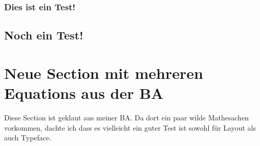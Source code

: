 \subsubsection{Dies ist ein Test!}
\lipsum[10-11]
\subsection{Noch ein Test!}
\lipsum[12-14]
\cite{tikhanovskayaUniversalityCrossEntropy2023}
\section{Neue Section mit mehreren Equations aus der BA}
Diese Section ist geklaut aus meiner BA. Da dort ein paar wilde Mathesachen
vorkommen, dachte ich dass es vielleicht ein guter Test ist sowohl für Layout
als auch Typeface.

